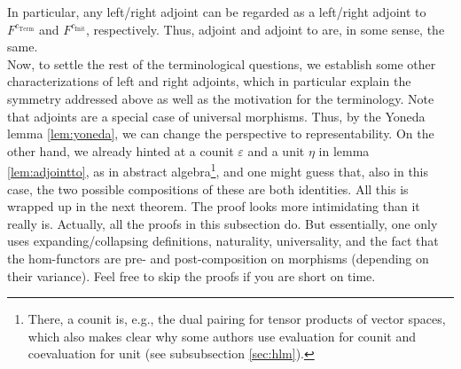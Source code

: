 In particular, any left/right adjoint can be regarded as a left/right adjoint to $F^{c_{\mathrm{Term}}}$ and $F^{c_{\mathrm{Init}}}$, respectively.
Thus, {\glqq}adjoint{\grqq} and {\glqq}adjoint to{\grqq} are, in some sense, the same.
\\
Now, to settle the rest of the terminological questions, we establish some other characterizations of left and right adjoints, which in particular explain the symmetry addressed above as well as the motivation for the terminology.
Note that adjoints are a special case of universal morphisms.
Thus, by the Yoneda lemma \ref{lem:yoneda}, we can change the perspective to representability.
On the other hand, we already hinted at a counit $\varepsilon$ and a unit $\eta$ in lemma \ref{lem:adjointto}, as in abstract algebra\footnote{There, a counit is, e.g., the dual pairing for tensor products of vector spaces, which also makes clear why some authors use evaluation for counit and coevaluation for unit (see subsubsection \ref{sec:hlm}).}, and one might guess that, also in this case, the two possible compositions of these are both identities.
All this is wrapped up in the next theorem.
The proof looks more intimidating than it really is.
Actually, all the proofs in this subsection do.
But essentially, one only uses expanding/collapsing definitions, naturality, universality, and the fact that the hom-functors are pre- and post-composition on morphisms (depending on their variance).
Feel free to skip the proofs if you are short on time.
\\
